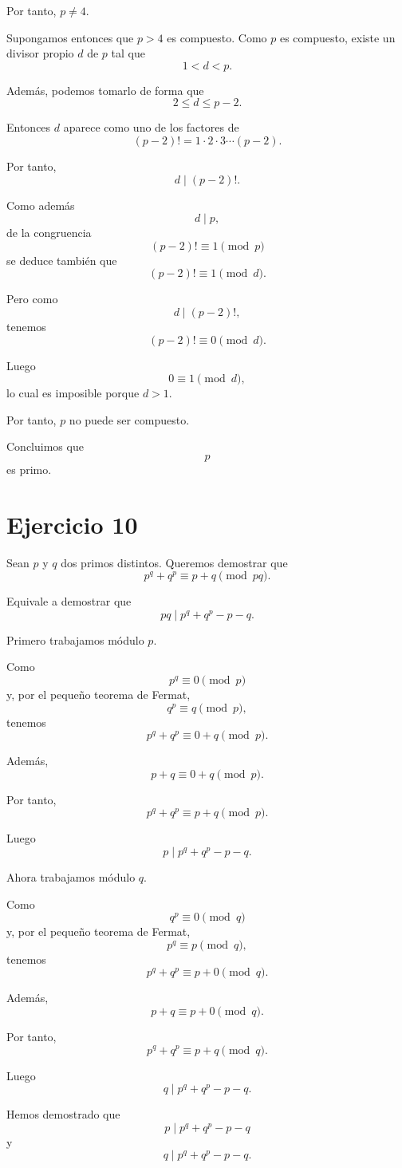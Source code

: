 \documentclass[12pt]{article}
\begin{document}
Por tanto, \(p\neq 4\).

Supongamos entonces que \(p>4\) es compuesto. Como \(p\) es compuesto, existe un divisor propio \(d\) de \(p\) tal que
\[
1<d<p.
\]

Además, podemos tomarlo de forma que
\[
2\leq d\leq p-2.
\]

Entonces \(d\) aparece como uno de los factores de
\[
(p-2)!=1\cdot 2\cdot 3\cdots(p-2).
\]

Por tanto,
\[
d \mid (p-2)!.
\]

Como además
\[
d\mid p,
\]
de la congruencia
\[
(p-2)!\equiv 1 \pmod p
\]
se deduce también que
\[
(p-2)!\equiv 1 \pmod d.
\]

Pero como
\[
d\mid (p-2)!,
\]
tenemos
\[
(p-2)! \equiv 0 \pmod d.
\]

Luego
\[
0\equiv 1 \pmod d,
\]
lo cual es imposible porque \(d>1\).

Por tanto, \(p\) no puede ser compuesto.

Concluimos que
\[
p
\]
es primo.

\section*{Ejercicio 10}

Sean \(p\) y \(q\) dos primos distintos. Queremos demostrar que
\[
p^q+q^p \equiv p+q \pmod{pq}.
\]

Equivale a demostrar que
\[
pq \mid p^q+q^p-p-q.
\]

Primero trabajamos módulo \(p\).

Como
\[
p^q\equiv 0 \pmod p
\]
y, por el pequeño teorema de Fermat,
\[
q^p\equiv q \pmod p,
\]
tenemos
\[
p^q+q^p\equiv 0+q \pmod p.
\]

Además,
\[
p+q\equiv 0+q \pmod p.
\]

Por tanto,
\[
p^q+q^p\equiv p+q \pmod p.
\]

Luego
\[
p\mid p^q+q^p-p-q.
\]

Ahora trabajamos módulo \(q\).

Como
\[
q^p\equiv 0 \pmod q
\]
y, por el pequeño teorema de Fermat,
\[
p^q\equiv p \pmod q,
\]
tenemos
\[
p^q+q^p\equiv p+0 \pmod q.
\]

Además,
\[
p+q\equiv p+0 \pmod q.
\]

Por tanto,
\[
p^q+q^p\equiv p+q \pmod q.
\]

Luego
\[
q\mid p^q+q^p-p-q.
\]

Hemos demostrado que
\[
p\mid p^q+q^p-p-q
\]
y
\[
q\mid p^q+q^p-p-q.
\]
\end{document}
